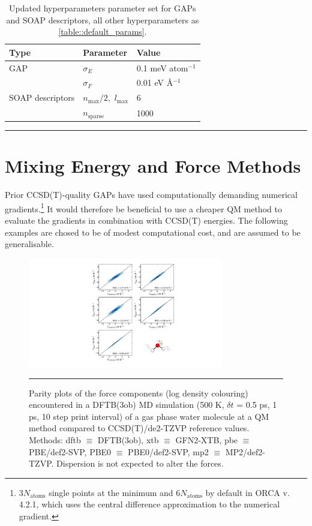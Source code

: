 \documentclass[11pt]{article}
\numberwithin{equation}{subsection}
\begin{document}
\begin{table}[h!]
	\def\arraystretch{1.3}
	\begin{tabularx}{\textwidth}{YYY}
		\hline
		Type&	Parameter	&Value\\
		\hline
		GAP	   &  $\sigma_E$	&  	0.1 meV atom${}^{-1}$ \\
			   &  $\sigma_F$	&  	0.01 eV \AA${}^{-1}$
		\\
		SOAP descriptors  
		&$n_\text{max}/2,$ $l_\text{max}$&6  \\
		 
		&$n_\text{sparse}$ &1000              
	\end{tabularx}
	\hrule
	\vspace{0.1cm}
	\caption{Updated hyperparameters parameter set for GAPs and SOAP descriptors, all other hyperparameters as {\tablename{ \ref{table::default_params}}}.}
	\label{table::updated_params}
\end{table}




\clearpage
\section{Mixing Energy and Force Methods} \label{section::SI_mixed_e_f}

Prior CCSD(T)-quality GAPs\cite{gaptrain2021} have used computationally demanding numerical gradients.\footnote{$3N_\text{atoms}$ single points at the minimum and $6N_\text{atoms}$ by default in ORCA v. 4.2.1, which uses the central difference approximation to the numerical gradient.} It would therefore be beneficial to use a cheaper QM method to evaluate the gradients in combination with CCSD(T) energies. The following examples are chosed to be of modest computational cost, and are assumed to be generalisable.


\begin{figure}[h!]
	\centering
	\includegraphics[width=0.76\textwidth]{figSX8.pdf}
	\vspace{0.1cm}
	\hrule
	\vspace{0.1cm}
	\caption{Parity plots of the force components (log density colouring) encountered in a DFTB(3ob) MD simulation (500 K, $\delta t$ = 0.5 ps, 1 ps, 10 step print interval) of a gas phase water molecule at a QM method compared to CCSD(T)/de2-TZVP reference values. Methods: dftb $\equiv$ DFTB(3ob), xtb $\equiv$ GFN2-XTB, pbe $\equiv$ PBE/def2-SVP, PBE0 $\equiv$ PBE0/def2-SVP, mp2 $\equiv$ MP2/def2-TZVP. Dispersion is not expected to alter the forces.}
	\label{fig::SX8}
\end{figure}
\end{document}
